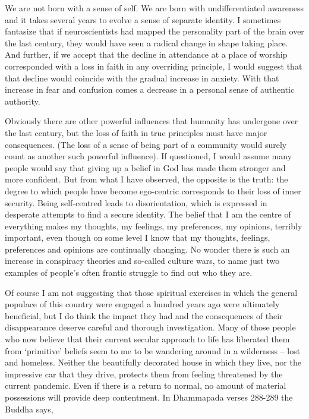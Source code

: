 We are not born with a sense of self. We are born with undifferentiated
awareness and it takes several years to evolve a sense of separate
identity. I sometimes fantasize that if neuroscientists had mapped the
personality part of the brain over the last century, they would have
seen a radical change in shape taking place. And further, if we accept
that the decline in attendance at a place of worship corresponded with a
loss in faith in any overriding principle, I would suggest that that
decline would coincide with the gradual increase in anxiety. With that
increase in fear and confusion comes a decrease in a personal sense of
authentic authority.

Obviously there are other powerful influences that humanity has
undergone over the last century, but the loss of faith in true
principles must have major consequences. (The loss of a sense of being
part of a community would surely count as another such powerful
influence). If questioned, I would assume many people would say that
giving up a belief in God has made them stronger and more confident. But
from what I have observed, the opposite is the truth: the degree to
which people have become ego-centric corresponds to their loss of inner
security. Being self-centred leads to disorientation, which is expressed
in desperate attempts to find a secure identity. The belief that I am
the centre of everything makes my thoughts, my feelings, my preferences,
my opinions, terribly important, even though on some level I know that
my thoughts, feelings, preferences and opinions are continually
changing. No wonder there is such an increase in conspiracy theories and
so-called culture wars, to name just two examples of people's often
frantic struggle to find out who they are.

\enlargethispage{\baselineskip}

Of course I am not suggesting that those spiritual exercises in which
the general populace of this country were engaged a hundred years ago
were ultimately beneficial, but I do think the impact they had and the
consequences of their disappearance deserve careful and thorough
investigation. Many of those people who now believe that their current
secular approach to life has liberated them from `primitive' beliefs
seem to me to be wandering around in a wilderness -- lost and homeless.
Neither the beautifully decorated house in which they live, nor the
impressive car that they drive, protects them from feeling threatened by
the current pandemic. Even if there is a return to normal, no amount of
material possessions will provide deep contentment. In Dhammapada verses
288-289 the Buddha says,

